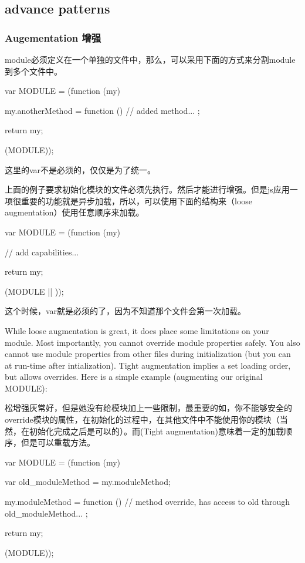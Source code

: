 \subsection{advance patterns}

\subsubsection{Augementation 增强}

module必须定义在一个单独的文件中，那么，可以采用下面的方式来分割module到多个文件中。

\begin{JavaScript}
var MODULE = (function (my) {
	my.anotherMethod = function () {
		// added method...
	};

	return my;
}(MODULE));
\end{JavaScript}

这里的var不是必须的，仅仅是为了统一。

上面的例子要求初始化模块的文件必须先执行。然后才能进行增强。但是js应用一项很重要的功能就是异步加载，所以，可以使用下面的结构来（loose augmentation）使用任意顺序来加载。

\begin{JavaScript}[每个文件都是用这个结构]
var MODULE = (function (my) {
	// add capabilities...

	return my;
}(MODULE || {}));
\end{JavaScript}
这个时候，var就是必须的了，因为不知道那个文件会第一次加载。

While loose augmentation is great, it does place some limitations on your module. Most importantly, you cannot override module properties safely. You also cannot use module properties from other files during initialization (but you can at run-time after intialization). Tight augmentation implies a set loading order, but allows overrides. Here is a simple example (augmenting our original MODULE):

松增强灰常好，但是她没有给模块加上一些限制，最重要的如，你不能够安全的override模块的属性，在初始化的过程中，在其他文件中不能使用你的模块（当然，在初始化完成之后是可以的）。而(Tight augmentation)意味着一定的加载顺序，但是可以重载方法。

\begin{JavaScript}
var MODULE = (function (my) {
	var old_moduleMethod = my.moduleMethod;

	my.moduleMethod = function () {
		// method override, has access to old through old_moduleMethod...
	};

	return my;
}(MODULE));

\end{JavaScript}


